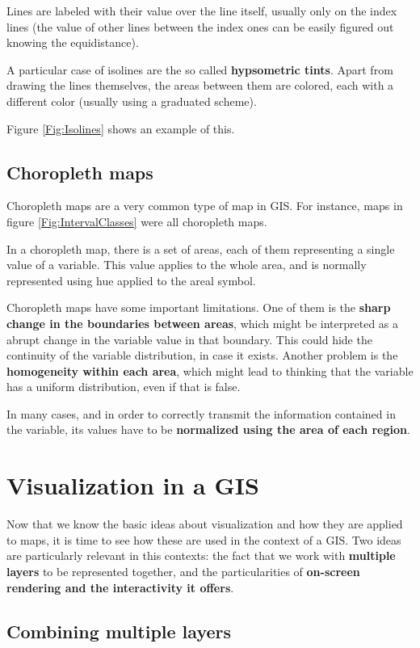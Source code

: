 Lines are labeled with their value over the line itself, usually only on the index lines (the value of other lines between the index ones can be easily figured out knowing the equidistance).

A particular case of isolines are the so called \textbf{hypsometric tints}. Apart from drawing the lines themselves, the areas between them are colored, each with a different color (usually using a graduated scheme).

Figure \ref{Fig:Isolines} shows an example of this.

\subsection{Choropleth maps}

Choropleth maps are a very common type of map in GIS. For instance, maps in figure \ref{Fig:IntervalClasses} were all choropleth maps.

In a choropleth map, there is a set of areas, each of them representing a single value of a variable. This value applies to the whole area, and is normally represented using hue applied to the areal symbol.

Choropleth maps have some  important limitations. One of them is the \textbf{sharp change in the boundaries between areas}, which might be interpreted as a abrupt change in the variable value in that boundary. This could hide the continuity of the variable distribution, in case it exists. Another problem is the \textbf{homogeneity within each area}, which might lead to thinking that the variable has a uniform distribution, even if that is false.

In many cases, and in order to correctly transmit the information contained in the variable, its values have to be \textbf{normalized using the area of each region}.


\section{Visualization in a GIS}

Now that we know the basic ideas about visualization and how they are applied to maps, it is time to see how these are used in the context of a GIS. Two ideas are particularly relevant in this contexts: the fact that we work with \textbf{multiple layers} to be represented together, and the particularities of \textbf{on-screen rendering and the interactivity it offers}.

\subsection{Combining multiple layers}

